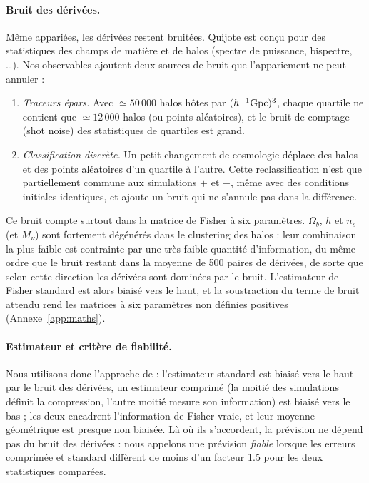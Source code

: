 \paragraph{Bruit des dérivées.} Même appariées, les dérivées restent bruitées. Quijote est conçu pour des statistiques des champs de matière et de halos (spectre de puissance, bispectre, \dots). Nos observables ajoutent deux sources de bruit que l'appariement ne peut annuler :
\begin{enumerate}
\item \emph{Traceurs épars.} Avec $\simeq50\,000$ halos hôtes par $(h^{-1}{\rm Gpc})^3$, chaque quartile ne contient que $\simeq12\,000$ halos (ou points aléatoires), et le bruit de comptage (shot noise) des statistiques de quartiles est grand.
\item \emph{Classification discrète.} Un petit changement de cosmologie déplace des halos et des points aléatoires d'un quartile à l'autre. Cette reclassification n'est que partiellement commune aux simulations $+$ et $-$, même avec des conditions initiales identiques, et ajoute un bruit qui ne s'annule pas dans la différence.
\end{enumerate}
Ce bruit compte surtout dans la matrice de Fisher à six paramètres. $\Omega_b$, $h$ et $n_s$ (et $M_\nu$) sont fortement dégénérés dans le clustering des halos : leur combinaison la plus faible est contrainte par une très faible quantité d'information, du même ordre que le bruit restant dans la moyenne de 500 paires de dérivées, de sorte que selon cette direction les dérivées sont dominées par le bruit. L'estimateur de Fisher standard est alors biaisé vers le haut, et la soustraction du terme de bruit attendu rend les matrices à six paramètres non définies positives (Annexe~\ref{app:maths}).

\paragraph{Estimateur et critère de fiabilité.} Nous utilisons donc l'approche de \cite{CoultonWandelt2023} : l'estimateur standard est biaisé vers le haut par le bruit des dérivées, un estimateur comprimé (la moitié des simulations définit la compression, l'autre moitié mesure son information) est biaisé vers le bas ; les deux encadrent l'information de Fisher vraie, et leur moyenne géométrique est presque non biaisée. Là où ils s'accordent, la prévision ne dépend pas du bruit des dérivées : nous appelons une prévision \emph{fiable} lorsque les erreurs comprimée et standard diffèrent de moins d'un facteur 1.5 pour les deux statistiques comparées.

